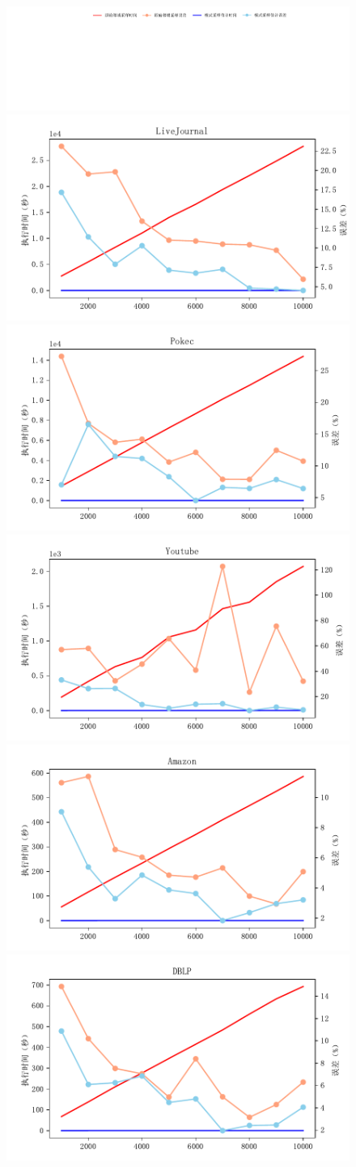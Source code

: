\documentclass[master]{thesis-uestc}
\begin{document}
\begin{figure}
    \includegraphics[width=0.8\linewidth]{pic/samp-cmp-asap/legend.pdf}\\
    \includegraphics[width=0.5\linewidth]{pic/samp-cmp-asap/LiveJournal.pdf}%
    \includegraphics[width=0.5\linewidth]{pic/samp-cmp-asap/Pokec.pdf}\\
    \includegraphics[width=0.5\linewidth]{pic/samp-cmp-asap/Youtube.pdf}%
    \includegraphics[width=0.5\linewidth]{pic/samp-cmp-asap/Amazon.pdf}\\
    \includegraphics[width=0.5\linewidth]{pic/samp-cmp-asap/DBLP.pdf}%

\end{figure}
\end{document}
